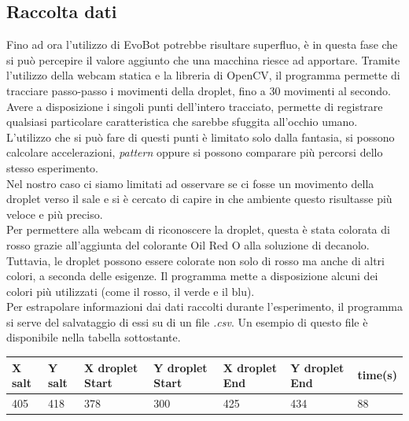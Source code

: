 \subsection{Raccolta dati}
Fino ad ora l'utilizzo di EvoBot potrebbe risultare superfluo, è in questa fase che si può percepire il valore aggiunto che una macchina riesce ad apportare. Tramite l'utilizzo della webcam statica e la libreria di OpenCV, il programma permette di tracciare passo-passo i movimenti della droplet, fino a 30 movimenti al secondo. Avere a disposizione i singoli punti dell'intero tracciato, permette di registrare qualsiasi particolare caratteristica che sarebbe sfuggita all'occhio umano. L'utilizzo che si  può fare di questi punti è limitato solo dalla fantasia, si possono calcolare accelerazioni, \emph{pattern} oppure si possono comparare più percorsi dello stesso esperimento.
\\Nel nostro caso ci siamo limitati ad osservare se ci fosse un movimento della droplet verso il sale e si è cercato di capire in che ambiente questo risultasse più veloce e più preciso.
\\Per permettere alla webcam di riconoscere la droplet, questa è stata colorata di rosso grazie all'aggiunta del colorante Oil Red O alla soluzione di decanolo. Tuttavia, le droplet possono essere colorate non solo di rosso ma anche di altri colori, a seconda delle esigenze. Il programma mette a disposizione alcuni dei colori più utilizzati (come il rosso, il verde e il blu). 
\\ Per estrapolare informazioni dai dati raccolti durante l'esperimento, il programma si serve del salvataggio di essi su di un file \emph{.csv}.
Un esempio di questo file è disponibile nella tabella sottostante. 

\begin{center}
\begin{tabular}{lllllll}
X salt & Y salt & X droplet Start & Y droplet Start & X droplet End & Y droplet End & time(s) \\
\hline
405    & 418    & 378             & 300             & 425           & 434           & 88  
\end{tabular}
\end{center}


